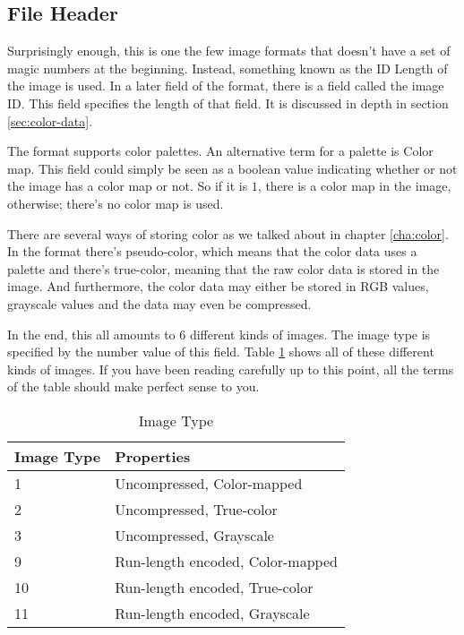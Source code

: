 \begin{refsection}
  \section{File Header}


  Surprisingly enough, this is one the few image formats that doesn't
  have a set of magic numbers at the beginning. Instead, something
  known as the ID Length of the image is used. In a later field of the
  format, there is a field called the image ID. This field specifies
  the length of that field. It is discussed in depth in section
  \ref{sec:color-data}.


  The \tga format supports color palettes. An alternative term for a
  palette is Color map. This field could simply be
  seen as a boolean value indicating whether or not the image has a color
  map or not. So if it is $1$, there is a color map in the
  image, otherwise; there's no color map is used.


  There are several ways of storing color as we talked about in
  chapter \ref{cha:color}. In the \tga format there's
  pseudo-color, which means that the color data
  uses a palette and there's true-color, meaning that the raw
  color data is stored in the image. And furthermore, the color data
  may either be stored in RGB values, grayscale values and the data
  may even be compressed.

  In the end, this all amounts to $6$ different kinds of images. The
  image type is specified by the number value of this field. Table \ref{tab:imgtype}
  shows all of these different kinds of images. If you have been
  reading carefully up to this point, all the terms of the table
  should make perfect sense to you.

  \begin{table}
    \centering
    \begin{tabular}{ll}
      \toprule
      Image Type & Properties \\
      \midrule
      1 & Uncompressed, Color-mapped \\
      2 & Uncompressed, True-color \\
      3 & Uncompressed, Grayscale\\
      9 & Run-length encoded, Color-mapped \\
      10 & Run-length encoded, True-color \\
      11 & Run-length encoded, Grayscale\\
      \bottomrule
    \end{tabular}
    \caption{Image Type}
    \label{tab:imgtype}
  \end{table}


\end{refsection}
